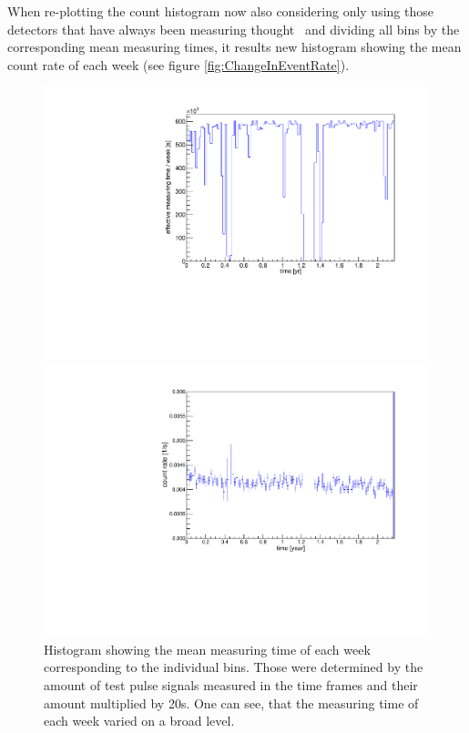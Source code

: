 \documentclass[encoding=utf8,british]{tumphthesis}
\begin{document}
When re-plotting the count histogram now also considering only using those detectors that have always been measuring thought \PII\ and dividing all bins by the corresponding mean measuring times, it results new histogram showing the mean count rate of each week (see figure \ref{fig:ChangeInEventRate}).
\\
\begin{figure}[t!]
	\centering
	\begin{minipage}[t]{.475\textwidth}
		\centering
		\includegraphics[width=\textwidth]{./Bilder/testpuler.pdf}
		\caption{
			Histogram showing the mean measuring time of each week corresponding to the individual bins.
			Those were determined by the amount of test pulse signals measured in the time frames and their amount multiplied by 20s.
			One can see, that the measuring time of each week varied on a broad level.
			}
		\label{fig:effectiveMeasuringTimes}
	\end{minipage}\hfill%
	\begin{minipage}[t]{.475\textwidth}
		\centering
		\includegraphics[width=\textwidth]{./Bilder/eventRate.pdf}

\end{minipage}
\end{figure}
\end{document}
